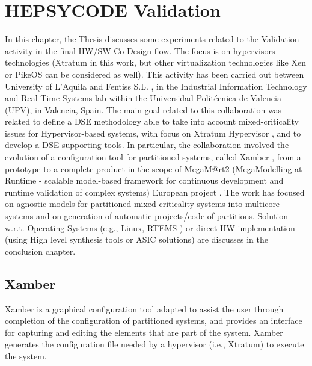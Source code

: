 \chapter{HEPSYCODE Validation}\label{chap08}  %
%
In this chapter, the Thesis discusses some experiments related to the Validation activity in the final HW/SW Co-Design flow. 
The focus is on hypervisors technologies (Xtratum \cite{xtratum_01} in this work, but other virtualization technologies like Xen \cite{xen_project} or PikeOS \cite{pikeos} can be considered as well). This activity has been carried out between University of L'Aquila and Fentiss S.L. \cite{fentiss_01}, in the Industrial Information Technology and Real-Time Systems lab within the Universidad Polit\'ecnica de Valencia (UPV), in Valencia, Spain. 
The main goal related to this collaboration was related to define a DSE methodology able to take into account mixed-criticality issues for Hypervisor-based systems, with focus on Xtratum Hypervisor \cite{xtratum_01}, and to develop a DSE supporting tools. In particular, the collaboration involved the evolution of a configuration tool for partitioned systems, called Xamber \cite{xamber}, from a prototype to a complete product in the scope of MegaM@rt2 (MegaModelling at Runtime - scalable model-based framework for continuous development and runtime validation of complex systems) European project \cite{megamart}. The work has focused on agnostic models for partitioned mixed-criticality systems into multicore systems and on generation of automatic projects/code of partitions. Solution w.r.t. Operating Systems (e.g., Linux, RTEMS \cite{rtems}) or direct HW implementation (using High level synthesis tools or ASIC solutions) are discusses in the conclusion chapter.
%
\section{Xamber}
%
Xamber is a graphical configuration tool adapted to assist the user through completion of the configuration of partitioned systems, and provides an interface for capturing and editing the elements that are part of the system. Xamber generates the configuration file needed by a hypervisor (i.e., Xtratum) to execute the system. \par
%
